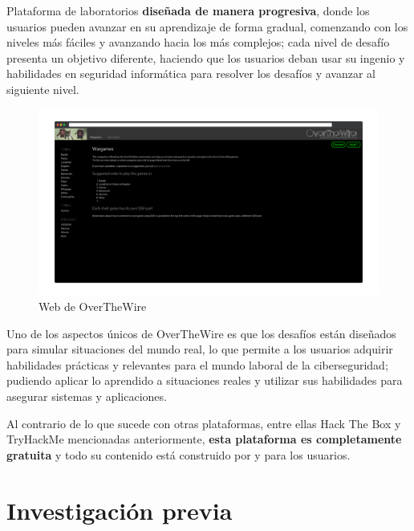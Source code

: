         Plataforma de laboratorios \textbf{diseñada de manera progresiva}, donde los usuarios pueden avanzar en su aprendizaje de forma gradual, comenzando con los niveles más fáciles y avanzando hacia los más complejos; cada nivel de desafío presenta un objetivo diferente, haciendo que los usuarios deban usar su ingenio y habilidades en seguridad informática para resolver los desafíos y avanzar al siguiente nivel.
        
        \begin{figure}[h]
            \centering
            \includegraphics[width=\textwidth]{images/Capturas/Web de OverTheWire.png}
            \caption{Web de OverTheWire}
            \label{fig:OverTheWire-web}
        \end{figure}
        
        Uno de los aspectos únicos de OverTheWire es que los desafíos están diseñados para simular situaciones del mundo real, lo que permite a los usuarios adquirir habilidades prácticas y relevantes para el mundo laboral de la ciberseguridad; pudiendo aplicar lo aprendido a situaciones reales y utilizar sus habilidades para asegurar sistemas y aplicaciones.
        
        Al contrario de lo que sucede con otras plataformas, entre ellas Hack The Box y TryHackMe mencionadas anteriormente, \textbf{esta plataforma es completamente gratuita} y todo su contenido está construido por y para los usuarios.
        
        \cleardoublepage
    
    

\chapter{Investigación previa}
    \label{cap:investigacion-previa}


